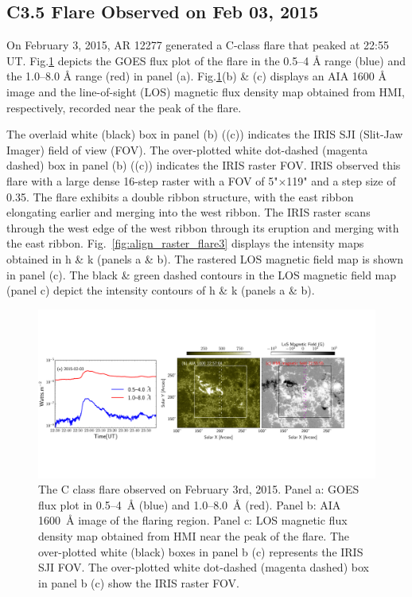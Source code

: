 \subsection{C3.5 Flare Observed on Feb 03, 2015}

On February 3, 2015, AR 12277 generated a C-class flare that peaked at 22:55 UT. Fig.\ref{flare3} depicts the GOES flux plot of the flare in the 0.5{--}4 {\AA} range (blue) and the 1.0{--}8.0 {\AA} range (red) in panel (a). Fig.\ref{flare3}(b) \& (c) displays an AIA 1600 {\AA} image and the line-of-sight (LOS) magnetic flux density map obtained from HMI, respectively, recorded near the peak of the flare.

The overlaid white (black) box in panel (b) ((c)) indicates the IRIS SJI (Slit-Jaw Imager) field of view (FOV). The over-plotted white dot-dashed (magenta dashed) box in panel (b) ((c)) indicates the IRIS raster FOV. IRIS observed this flare with a large dense 16-step raster with a FOV of 5"$\times$119" and a step size of 0.35\arcsec. The flare exhibits a double ribbon structure, with the east ribbon elongating earlier and merging into the west ribbon. The IRIS raster scans through the west edge of the west ribbon through its eruption and merging with the east ribbon. Fig.~\ref{fig:align_raster_flare3} displays the intensity maps obtained in   h \& k (panels a \& b). The rastered LOS magnetic field map is shown in panel (c). The black \& green dashed contours in the LOS magnetic field map (panel c) depict the intensity contours of   h \& k (panels a \& b).

\begin{figure}[ht!]
    \centering
\includegraphics[width=\textwidth,trim={0cm 4.5cm 3cm 4cm},clip]{Figures/Flare_C_feb03_2015.pdf}
\caption[The observations of the X flare on February 3rd, 2015.]{The C class flare observed on February 3rd, 2015. Panel a: GOES flux plot in 0.5{--}4~{\AA} (blue) and 1.0{--}8.0~{\AA} (red). Panel b: AIA 1600~{\AA} image of the flaring region. Panel c: LOS magnetic flux density map obtained from HMI near the peak of the flare. The over-plotted white (black) boxes in panel b (c) represents the IRIS SJI FOV. The over-plotted white dot-dashed (magenta dashed) box in panel b (c) show the IRIS raster FOV.}\label{flare3}
\end{figure}

